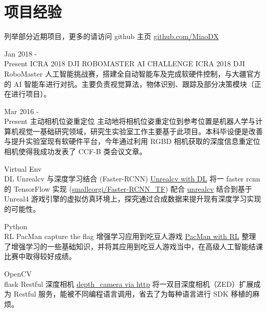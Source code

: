 \documentclass[utf8]{twentysecondcv} %
\begin{document}
\section{项目经验}
\begin{twenty}

    \twentyitem
        {}
        {列举部分近期项目，更多的请访问 github 主页}
        {\href{https://github.com/MiaoDX/}{github.com/MiaoDX}}
        {}
        {}
          
    \twentyitem
    {Jan 2018 - \\ Present}
    {ICRA 2018 DJI ROBOMASTER AI CHALLENGE}
    {}
    {}
    {ICRA 2018 DJI RoboMaster 人工智能挑战赛，搭建全自动智能车及完成软硬件控制，与大疆官方的 AI 智能车进行对抗。主要负责视觉算法，物体识别、跟踪及部分决策模块（正在进行项目）。}              
          

    \twentyitem
    {Mar 2016 - \\ Present}
    {主动相机位姿重定位}
    {}
    {}
    {主动地将相机位姿重定位到参考位置是机器人学与计算机视觉一基础研究领域，研究生实验室工作主要基于此项目。本科毕设便是改善与提升实验室现有软硬件平台，今年通过利用 RGBD 相机获取的深度信息重定位相机使得我成功发表了 CCF-B 类会议文章。}
          
    \twentyitem
        {Virtual Env \\ DL}
        {Unrealcv 与深度学习结合 (Faster-RCNN)}
        {\href{https://github.com/MiaoDX/unrealcv_examples/}{Unrealcv with DL}}
        {}
        {将一 faster rcnn 的 TensorFlow 实现 (\href{https://github.com/smallcorgi/Faster-RCNN\_TF}{smallcorgi/Faster-RCNN\_TF}) 配合 \href{https://github.com/unrealcv/unrealcv}{unrealcv} 结合到基于 Unreal4 游戏引擎的虚拟仿真环境上，探究通过合成数据来提升现有深度学习实现的可能性。}
                 
    \twentyitem
        {Python \\ RL}
        {PacMan capture the flag 增强学习应用到吃豆人游戏}
        {\href{https://github.com/MiaoDX/hand_in_homework/tree/master/Advanced\_AI/}{PacMan with RL}}
        {}
        {整理了增强学习的一些基础知识，并将其应用到吃豆人游戏当中，在高级人工智能结课比赛中取得较好成绩。}
        
   \twentyitem
        {OpenCV \\ flask}
        {Restful 深度相机}
        {\href{https://github.com/MiaoDX/depth\_camera}{depth\_camera via http}}
        {}
        {将一双目深度相机（ZED）扩展成为 Restful 服务，能被不同编程语言调用，省去了为每种语言进行 SDK 移植的麻烦。}
        
\end{twenty}
\end{document}
